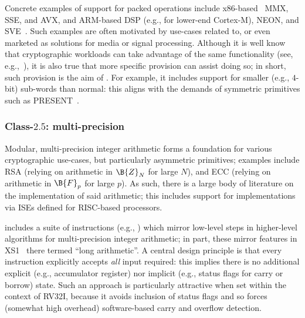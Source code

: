 Concrete examples of support for packed operations include
x86-based~\cite[Section 2.2.7]{SCARV:X86:2:18} MMX, SSE, and AVX,
and
ARM-based DSP (e.g., for lower-end Cortex-M), NEON, and SVE~\cite{SCARV:SBBEEGHMMPRRW:17}.
Such examples are often motivated by use-cases related to, or even marketed 
as solutions for media or signal processing.  Although it is well know that
cryptographic workloads can take advantage of the same functionality
(see, e.g.,~\cite{SCARV:Hamburg:09,SCARV:BerSch:12}),
it is also true that more specific provision can assist doing so; in short,
such provision is the aim of \XCID.  For example, it includes support for
smaller (e.g., $4$-bit) sub-words than normal: this aligns with the demands
of symmetric primitives such as PRESENT~\cite{SCARV:BKLPPRSV:07}.


\subsubsection{Class-$2.5$: multi-precision}
\label{sec:bg:feature:2:5}

Modular, multi-precision integer arithmetic forms a foundation for various
cryptographic use-cases, but particularly asymmetric primitives; examples 
include
RSA (relying on arithmetic in $\B{Z}_N$ for large $N$),
and
ECC (relying on arithmetic in $\B{F}_p$ for large $p$).
As such, there is a large body of literature on the implementation of said 
arithmetic; this includes support for implementations via ISEs defined for 
RISC-based processors.

\XCID includes a suite of instructions 
(e.g., )
which mirror low-level steps in higher-level algorithms for multi-precision 
integer arithmetic; in part, these mirror features in 
XS1~\cite[Section 18]{SCARV:XS1:09} 
there termed ``long arithmetic''.  A central design principle is that every
instruction explicitly accepts {\em all} input required: this implies there
is no additional
explicit (e.g., accumulator register) 
nor 
implicit (e.g., status flags for carry or borrow)
state.
Such an approach is particularly attractive when set within the context of 
RV32I, because it avoids inclusion of status flags and so forces (somewhat 
high overhead) software-based carry and overflow detection.

